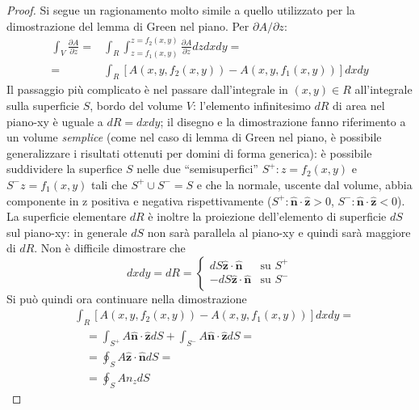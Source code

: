 %
\begin{proof} Si segue un ragionamento molto simile a quello utilizzato per la dimostrazione del lemma di Green nel piano.
  Per ${\partial A}/{\partial z}$:
\begin{equation}
\begin{aligned}
\int_V \frac{\partial A}{\partial z} = &
\int_R \int_{z = f_1(x,y)}^{z = f_2(x,y)} \frac{\partial A}{\partial z} dz dx dy = \\
= & \int_R [A(x,y,f_2(x,y)) - A(x,y,f_1(x,y))] dx dy %
\end{aligned}
\end{equation}
%
Il passaggio più complicato è nel passare dall'integrale in $(x,y) \in R$ all'integrale sulla superficie $S$, bordo del
 volume $V$: l'elemento infinitesimo $dR$ di 
 area nel piano-xy è uguale a $dR = dx dy$; il disegno e la dimostrazione fanno riferimento a un volume \textit{semplice}
 (come nel caso di lemma di Green nel piano, è possibile generalizzare i risultati ottenuti per domini di forma generica):
 è possibile suddividere la superfice $S$ nelle due ``semisuperfici'' $S^+: z = f_2(x,y)$ e $S^- z = f_1(x,y)$ tali che
 $S^+ \cup S^- = S$ e che la normale, uscente dal volume,
 abbia componente in z positiva e negativa rispettivamente ($S^+ : \bm{\hat{n}}\cdot\bm{\hat{z}}>0$, $S^- : \bm{\hat{n}}
 \cdot\bm{\hat{z}}<0$).
La superficie elementare $dR$ è inoltre la proiezione dell'elemento di superficie $dS$ sul piano-xy: in generale $dS$ non sarà
 parallela al piano-xy e quindi sarà maggiore di $dR$. Non è difficile dimostrare che
\begin{equation}
 dx dy = dR = 
 \begin{cases}
   dS \bm{\hat{z}} \cdot \bm{\hat{n}}  & \text{su $S^+$} \\
  - dS \bm{\hat{z}} \cdot \bm{\hat{n}}  & \text{su $S^-$} \\ 
 \end{cases}
\end{equation}
Si può quindi ora continuare nella dimostrazione
\begin{equation}
\begin{aligned}
 & \int_R [A(x,y,f_2(x,y)) - A(x,y,f_1(x,y))] dx dy =   \\
 & \quad = \int_{S^+} A \bm{\hat{n}} \cdot\bm{\hat{z}} dS + \int_{S^-} A \bm{\hat{n}} \cdot\bm{\hat{z}} dS = \\
 & \quad =  \oint_S A \bm{\hat{z}} \cdot \bm{\hat{n}} dS = \\
 & \quad =  \oint_S A n_z dS
\end{aligned}
\end{equation}
\end{proof}
